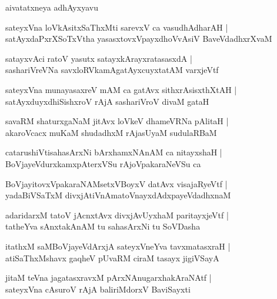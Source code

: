 \documentclass[twoside,12pt,openright]{book}
\newcounter{shloka}[chapter]
\begin{document}
\begin{center}
aivatatxneya adhAyxyavu
\end{center}

\begin{shloka}%
sateyxVna loVkAsitxSaThxMti sarevxV ca vasudhAdharAH |\\
satAyxdaPxrXSoTxVtha yasasxtovxVpayxdhoVvAsiV BaveVdadhxrXvaM 
\end{shloka}

\begin{shloka}%
satayxvAci ratoV yasutx satayxkArayxratasasxdA |\\
sashariVreVNa savxloRVkamAgatAyxcuyxtatAM varxjeVtf 
\end{shloka}

\begin{shloka}%
sateyxVna munayasaxreV mAM ca gatAvx sithxrAsisxthXtAH |\\
satAyxduyxdhiSishxroV rAjA sashariVroV divaM gataH 
\end{shloka}

\begin{shloka}%
savaRM shaturxgaNaM jitAvx loVkeV dhameVRNa pAlitaH |\\
akaroVcacx muKaM shudadhxM rAjasUyaM sudulaRBaM 
\end{shloka}

\begin{shloka}%
catarushiVtisahasArxNi bArxhamxNAnAM ca nitayxshaH |\\
BoVjayeVdurxkamxpAterxVSu rAjoVpakaraNeVSu ca
\end{shloka}

\begin{shloka}%
BoVjayitovxVpakaraNAMsetxVBoyxV datAvx visajaRyeVtf |\\
yadaBiVSaTxM divxjAtiVnAmatoVnayxdAdxpayeVdadhxnaM 
\end{shloka}

\begin{shloka}%
adaridarxM tatoV jAcnxtAvx divxjAvUyxhaM paritayxjeVtf |\\
tatheYva sAnxtakAnAM tu sahasArxNi tu SoVDasha
\end{shloka}

\begin{shloka}%
itathxM saMBoVjayeVdArxjA sateyxVneYva tavxmatasxraH |\\
atiSaThxMshavx gaqheV pUvaRM ciraM tasayx jigiVSayA 
\end{shloka}

\begin{shloka}%
jitaM teVna jagatasxravxM pArxNAnugarxhakAraNAtf |\\
sateyxVna cAsuroV rAjA baliriMdorxV BaviSayxti 
\end{shloka}
\end{document}
